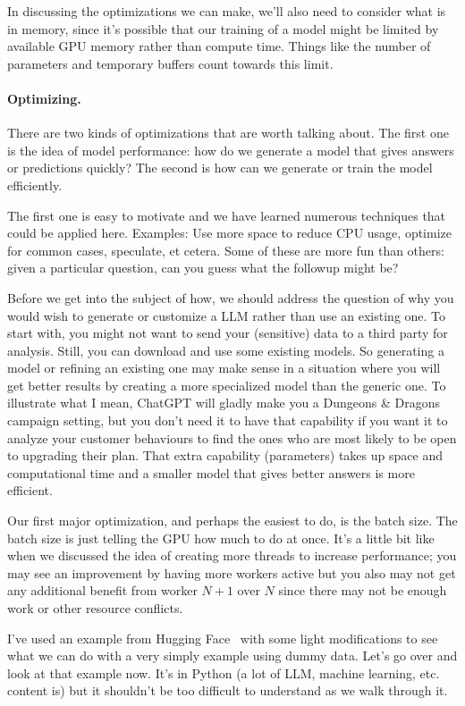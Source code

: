 \documentclass[a4paper]{report}
\begin{document}
In discussing the optimizations we can make, we'll also need to consider what is in memory, since it's possible that our training of a model might be limited by available GPU memory rather than compute time. Things like the number of parameters and temporary buffers count towards this limit.

\paragraph{Optimizing.}There are two kinds of optimizations that are worth talking about. The first one is the idea of model performance: how do we generate a model that gives answers or predictions quickly? The second is how can we generate or train the model efficiently.

The first one is easy to motivate and we have learned numerous techniques that could be applied here. Examples: Use more space to reduce CPU usage, optimize for common cases, speculate, et cetera. Some of these are more fun than others: given a particular question, can you guess what the followup might be? 

Before we get into the subject of how, we should address the question of why you would wish to generate or customize a LLM rather than use an existing one. To start with, you might not want to send your (sensitive) data to a third party for analysis. Still, you can download and use some existing models. So generating a model or refining an existing one may make sense in a situation where you will get better results by creating a more specialized model than the generic one. To illustrate what I mean, ChatGPT will gladly make you a Dungeons \& Dragons campaign setting, but you don't need it to have that capability if you want it to analyze your customer behaviours to find the ones who are most likely to be open to upgrading their plan. That extra capability (parameters) takes up space and computational time and a smaller model that gives better answers is more efficient.

Our first major optimization, and perhaps the easiest to do, is the batch size. The batch size is just telling the GPU how much to do at once. It's a little bit like when we discussed the idea of creating more threads to increase performance; you may see an improvement by having more workers active but you also may not get any additional benefit from worker $N+1$ over $N$ since there may not be enough work or other resource conflicts.

I've used an example from Hugging Face~\cite{hf2} with some light modifications to see what we can do with a very simply example using dummy data. Let's go over and look at that example now. It's in Python (a lot of LLM, machine learning, etc. content is) but it shouldn't be too difficult to understand as we walk through it.
\end{document}

